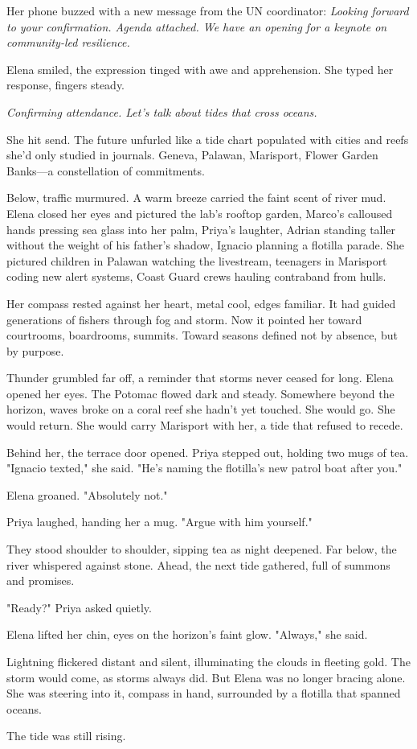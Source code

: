 Her phone buzzed with a new message from the UN coordinator: \textit{Looking forward to your confirmation. Agenda attached. We have an opening for a keynote on community-led resilience.}

Elena smiled, the expression tinged with awe and apprehension. She typed her response, fingers steady.

\textit{Confirming attendance. Let's talk about tides that cross oceans.}

She hit send. The future unfurled like a tide chart populated with cities and reefs she'd only studied in journals. Geneva, Palawan, Marisport, Flower Garden Banks—a constellation of commitments.

Below, traffic murmured. A warm breeze carried the faint scent of river mud. Elena closed her eyes and pictured the lab's rooftop garden, Marco's calloused hands pressing sea glass into her palm, Priya's laughter, Adrian standing taller without the weight of his father's shadow, Ignacio planning a flotilla parade. She pictured children in Palawan watching the livestream, teenagers in Marisport coding new alert systems, Coast Guard crews hauling contraband from hulls.

Her compass rested against her heart, metal cool, edges familiar. It had guided generations of fishers through fog and storm. Now it pointed her toward courtrooms, boardrooms, summits. Toward seasons defined not by absence, but by purpose.

Thunder grumbled far off, a reminder that storms never ceased for long. Elena opened her eyes. The Potomac flowed dark and steady. Somewhere beyond the horizon, waves broke on a coral reef she hadn't yet touched. She would go. She would return. She would carry Marisport with her, a tide that refused to recede.

Behind her, the terrace door opened. Priya stepped out, holding two mugs of tea. "Ignacio texted," she said. "He's naming the flotilla's new patrol boat after you."

Elena groaned. "Absolutely not."

Priya laughed, handing her a mug. "Argue with him yourself."

They stood shoulder to shoulder, sipping tea as night deepened. Far below, the river whispered against stone. Ahead, the next tide gathered, full of summons and promises.

"Ready?" Priya asked quietly.

Elena lifted her chin, eyes on the horizon's faint glow. "Always," she said.

Lightning flickered distant and silent, illuminating the clouds in fleeting gold. The storm would come, as storms always did. But Elena was no longer bracing alone. She was steering into it, compass in hand, surrounded by a flotilla that spanned oceans.

The tide was still rising.
